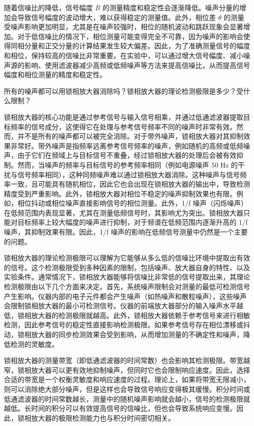 随着信噪比的降低，信号幅度 \( R \) 的测量精度和稳定性会逐渐降低。噪声分量的增加会导致信号幅度的波动增大，难以获得稳定的测量值。此外，相位差 \( \theta \) 的测量受噪声影响更加明显，尤其是在噪声较强时，相位的随机波动和跳跃现象会显著增加。对于低信噪比的情况下，相位测量可能变得完全不可靠，因为噪声的影响会使得同相分量和正交分量的计算结果发生较大偏差。因此，为了准确测量信号的幅度和相位，保持较高的信噪比非常重要。在实验中，可以通过增大信号幅度、减小噪声源的影响、使用滤波器减少高频或低频噪声等方法来提高信噪比，从而提高信号幅度和相位测量的精度和稳定性。

\begin{question}
	所有的噪声都可以用锁相放大器消除吗？锁相放大器的理论检测极限是多少？受什么限制？
\end{question}
锁相放大器的核心功能是通过参考信号与输入信号相乘，并通过低通滤波器提取目标频率的信号成分，这使得它在处理与参考信号频率不同的噪声时非常有效。然而，并不是所有的噪声都可以被完全消除。对于带外噪声，锁相放大器对其抑制效果非常好。带外噪声是指频率远离参考信号频率的噪声，例如随机的高频或低频噪声，由于它们在频域上与目标信号不重叠，经过锁相放大器的处理后会被有效抑制。然而，当噪声的频率与目标信号的参考频率相同（例如电源噪声 50 Hz 的干扰与信号频率相同），这种同频噪声难以通过锁相放大器消除。这种噪声与信号频率一致，且可能具有随机相位，因此它也会出现在锁相放大器的输出中，导致检测精度受到严重影响。此外，锁相放大器对相位不稳定的噪声抑制效果也有限。例如，相位抖动或相位噪声直接影响信号的相位测量。此外，1/f 噪声（闪烁噪声）在低频范围内表现显著，尤其在测量低频信号时，其影响尤为突出。锁相放大器只能对目标频率上较大幅度的噪声进行抑制，对于频谱在低频范围内逐渐升高的 1/f 噪声，其抑制效果有限。因此，1/f 噪声的影响在低频信号测量中仍然是一个主要的问题。

锁相放大器的理论检测极限可以理解为它能够从多么低的信噪比环境中提取出有效的信号。这个检测极限受到多种因素的限制，包括噪声、放大器自身的特性、以及实验条件。通常情况下，锁相放大器能够将信噪比非常低的信号提取出来，其理论检测极限由以下几个方面来决定。首先，系统噪声限制会对测量的最低可检测信号产生影响。仪器内部的电子元件都会产生噪声（如热噪声和散粒噪声），这些噪声会限制锁相放大器的最小可检测信号。仪器的前端放大器部分的输入噪声水平越低，锁相放大器的检测极限就越高。此外，锁相放大器依赖于参考信号来进行相敏检测，因此参考信号的稳定性直接影响检测极限。如果参考信号存在相位漂移或抖动，锁相放大器的同步检测效果会受到影响，从而增加测量的不确定性和噪声，降低检测的灵敏度。

锁相放大器的测量带宽（即低通滤波器的时间常数）也会影响其检测极限。带宽越窄，锁相放大器可以更有效地抑制噪声，但同时它也会限制响应速度。因此，选择合适的带宽是一个权衡灵敏度和响应速度的过程。理论上，如果将带宽无限减小，则可以消除绝大部分噪声，但是这样也会导致信号响应变得极其缓慢。积分时间或低通滤波器的时间常数越长，测量中的随机噪声影响就会越小，信号的检测极限就越低。长时间的积分可以有效提高信号的信噪比，但也会导致系统响应变慢。因此，锁相放大器的极限检测能力也与积分时间密切相关。

